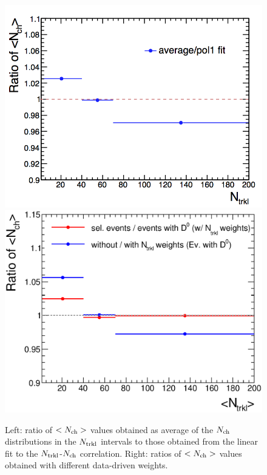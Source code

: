 \begin{figure}[!h]
\centering
 \includegraphics[width=.49\textwidth]{FigCap6/NchSystematics_linFit_WithNtrklsReweight_17f2a.png}
 \includegraphics[width=.49\textwidth]{FigCap6/NchSystematics_NtrklWeights_17f2a.eps}
 \caption{Left: ratio of $\averNch$ values obtained as average of the $N_{\rm ch}$ distributions in the $\Ntrkl$ intervals to those obtained from the linear fit to the $\Ntrkl$-$N_{\rm ch}$ correlation. Right: ratios of $\averNch$ values obtained with different data-driven weights.}
 \label{fig:NchVsCorrHypo}
 \end{figure}

\begin{table}[h!]
\centering
{}
\caption{Systematic uncertainties on $\averNch$ values in each of the three $\Ntrkl$ multiplicity intervals.}
\label{tab:DsVsMult_syst}
\end{table}

